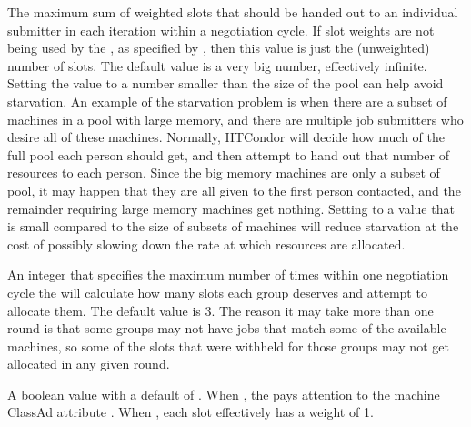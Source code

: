 \begin{description}
\label{param:GroupQuotaRoundRobinRate}
\item[\Macro{GROUP\_QUOTA\_ROUND\_ROBIN\_RATE}]
  The maximum sum of weighted slots that should be handed out to an individual 
  submitter in each iteration within a negotiation cycle. 
  If slot weights are not being used by the ,
  as specified by ,
  then this value is just the (unweighted) number of slots. 
  The default value is a very big number, effectively infinite. 
  Setting the value to a number smaller than the size of the pool 
  can help avoid starvation. 
  An example of the starvation problem is when there are a subset of machines 
  in a pool with large memory,
  and there are multiple job submitters who desire all of these machines.
  Normally, HTCondor will decide how much of the full pool each person should get,
  and then attempt to hand out that number of resources to each person. 
  Since the big memory machines are only a subset of pool, 
  it may happen that they are all given to the first person contacted, 
  and the remainder requiring large memory machines get nothing. 
  Setting  to a value that is small 
  compared to the size of subsets of machines will reduce starvation at the 
  cost of possibly slowing down the rate at which resources are allocated.

\label{param:GroupQuotaMaxAllocationRounds}
\item[\Macro{GROUP\_QUOTA\_MAX\_ALLOCATION\_ROUNDS}]
  An integer that specifies the maximum number of times within 
  one negotiation cycle the  will calculate how many 
  slots each group deserves and attempt to allocate them. 
  The default value is 3. 
  The reason it may take more than one round is that some groups may not 
  have jobs that match some of the available machines, 
  so some of the slots that were withheld for those groups 
  may not get allocated in any given round.

\label{param:NegotiatorUseSlotWeights}
\item[\Macro{NEGOTIATOR\_USE\_SLOT\_WEIGHTS}]
  A boolean value with a default of . 
  When , the  pays attention to the
  machine ClassAd attribute . 
  When , each slot effectively has a weight of 1.


\end{description}
